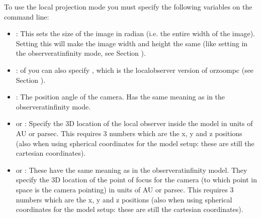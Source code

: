 \documentclass[letterpaper,10pt,english]{sphinxmanual}
\begin{document}
To use the local projection mode you must specify the following variables
on the command line:
\begin{itemize}
\item {} 
:
This sets the size of the image in radian (i.e. the entire width of the
image). Setting this will make the image width and height the same (like
setting  in the observer\sphinxhyphen{}at\sphinxhyphen{}infinity mode, see Section
{\hyperref[\detokenize{imagesspectra:sec-images}]{}}).

\item {} 
:
 of  you can also specify , which is the
local\sphinxhyphen{}observer version of  or\textasciigrave{}\textasciigrave{}zoompc\textasciigrave{}\textasciigrave{} (see Section
{\hyperref[\detokenize{imagesspectra:sec-images}]{}}).

\item {} 
:
The position angle of the camera. Has the same meaning as in the
observer\sphinxhyphen{}at\sphinxhyphen{}infinity mode.

\item {} 
 or :
Specify the 3\sphinxhyphen{}D location of the local observer inside the model in units
of AU or parsec. This requires 3 numbers which are the x, y and z
positions (also when using spherical coordinates for the model setup:
these are still the cartesian coordinates).

\item {} 
 or :
These have the same meaning as in the observer\sphinxhyphen{}at\sphinxhyphen{}infinity model.  They
specify the 3\sphinxhyphen{}D location of the point of focus for the camera (to which
point in space is the camera pointing) in units of AU or parsec. This
requires 3 numbers which are the x, y and z positions (also when using
spherical coordinates for the model setup: these are still the cartesian
coordinates).


\end{itemize}
\end{document}
